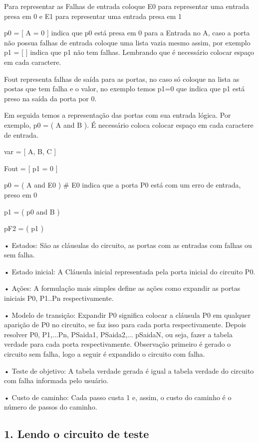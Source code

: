 \documentclass[11pt]{article}
\begin{document}
Para representar as Falhas de entrada coloque E0 para representar uma
entrada presa em 0 e E1 para representar uma entrada presa em 1

p0 = {[} A = 0 {]} indica que p0 está presa em 0 para a Entrada no A,
caso a porta não possua falhas de entrada coloque uma lista vazia mesmo
assim, por exemplo p1 = {[} {]} indica que p1 não tem falhas. Lembrando
que é necessário colocar espaço em cada caractere.

Fout representa falhas de saída para as portas, no caso só coloque na
lista as postas que tem falha e o valor, no exemplo temos p1=0 que
indica que p1 está preso na saída da porta por 0.

Em seguida temos a representação das portas com sua entrada lógica. Por
exemplo, p0 = ( A and B ). É necessário coloca colocar espaço em cada
caractere de entrada.

var = {[} A, B, C {]}

Fout = {[} p1 = 0 {]}

p0 = ( A and E0 ) \# E0 indica que a porta P0 está com um erro de
entrada, preso em 0

p1 = ( p0 and B )

pF2 = ( p1 )

    • Estados: São as cláusulas do circuito, as portas com as entradas com
falhas ou sem falha.

• Estado inicial: A Cláusula inicial representada pela porta inicial do
circuito P0.

• Ações: A formulação mais simples define as ações como expandir as
portas iniciais P0, P1..Pn respectivamente.

• Modelo de transição: Expandir P0 significa colocar a cláusula P0 em
qualquer aparição de P0 no circuito, se faz isso para cada porta
respectivamente. Depois resolver P0, P1,...Pn, PSaida1, PSaida2,...
pSaidaN, ou seja, fazer a tabela verdade para cada porta
respectivamente. Observação primeiro é gerado o circuito sem falha, logo
a seguir é expandido o circuito com falha.

• Teste de objetivo: A tabela verdade gerada é igual a tabela verdade do
circuito com falha informada pelo usuário.

• Custo de caminho: Cada passo custa 1 e, assim, o custo do caminho é o
número de passos do caminho.

    \subsection{1. Lendo o circuito de
teste}\label{lendo-o-circuito-de-teste}
\end{document}
